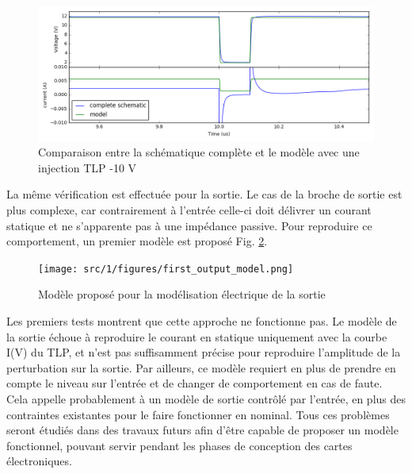 \begin{figure}[!h]
  \centering
  \includegraphics[width=\textwidth]{src/1/figures/comparison_model_total_m10V.png}
  \caption{Comparaison entre la schématique complète et le modèle avec une injection TLP -10 V}
  \label{fig:compare-model-simu-m10}
\end{figure}

La même vérification est effectuée pour la sortie.
Le cas de la broche de sortie est plus complexe, car contrairement à l'entrée celle-ci doit délivrer un courant statique et ne s'apparente pas à une impédance passive.
Pour reproduire ce comportement, un premier modèle est proposé Fig. \ref{fig:first-output-model}.

\begin{figure}[!h]
  \centering
  \texttt{[image: src/1/figures/first\_output\_model.png]}
  \caption{Modèle proposé pour la modélisation électrique de la sortie}
  \label{fig:first-output-model}
\end{figure}

Les premiers tests montrent que cette approche ne fonctionne pas.
Le modèle de la sortie échoue à reproduire le courant en statique uniquement avec la courbe I(V) du TLP, et n'est pas suffisamment précise pour reproduire l'amplitude de la perturbation sur la sortie.
Par ailleurs, ce modèle requiert en plus de prendre en compte le niveau sur l'entrée et de changer de comportement en cas de faute.
Cela appelle probablement à un modèle de sortie contrôlé par l'entrée, en plus des contraintes existantes pour le faire fonctionner en nominal.
Tous ces problèmes seront étudiés dans des travaux futurs afin d'être capable de proposer un modèle fonctionnel, pouvant servir pendant les phases de conception des cartes électroniques.

